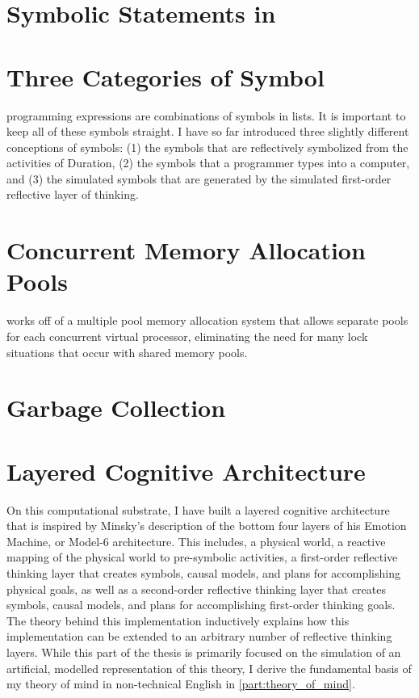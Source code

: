 \section{Symbolic Statements in \FibR}

\section{Three Categories of Symbol}

\FibR programming expressions are combinations of symbols in lists.
It is important to keep all of these symbols straight.  I have so far
introduced three slightly different conceptions of symbols: (1) the
symbols that are reflectively symbolized from the activities of
Duration, (2) the symbols that a programmer types into a computer, and
(3) the simulated symbols that are generated by the simulated
first-order reflective layer of thinking.

\section{Concurrent Memory Allocation Pools}

\FibR works off of a multiple pool memory allocation system that
allows separate pools for each concurrent virtual processor,
eliminating the need for many lock situations that occur with shared
memory pools.

\section{Garbage Collection}



\section{Layered Cognitive Architecture}

On this computational substrate, I have built a layered cognitive
architecture that is inspired by Minsky's description of the bottom
four layers of his Emotion Machine, or Model-6 architecture.  This
includes, a physical world, a reactive mapping of the physical world
to pre-symbolic activities, a first-order reflective thinking layer
that creates symbols, causal models, and plans for accomplishing
physical goals, as well as a second-order reflective thinking layer
that creates symbols, causal models, and plans for accomplishing
first-order thinking goals.  The theory behind this implementation
inductively explains how this implementation can be extended to an
arbitrary number of reflective thinking layers.  While this part of
the thesis is primarily focused on the simulation of an artificial,
modelled representation of this theory, I derive the fundamental basis
of my theory of mind in non-technical English in
\autoref{part:theory_of_mind}.

